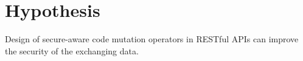 \section{Hypothesis}

Design of secure-aware code mutation operators in RESTful APIs can improve the security of the exchanging data.
